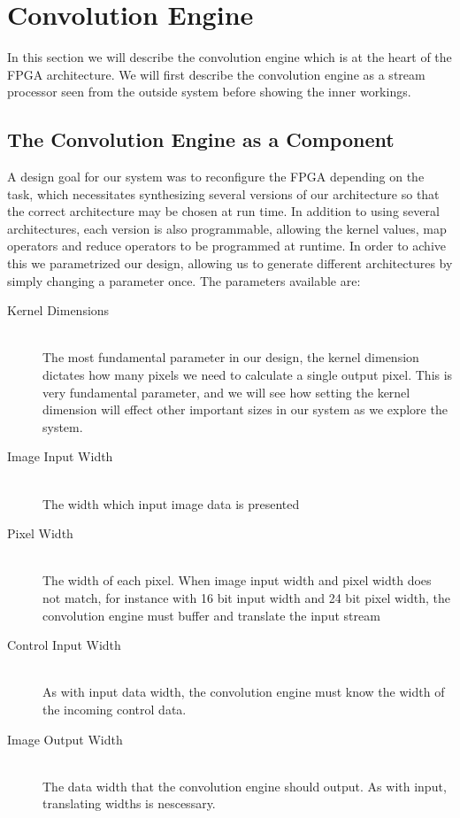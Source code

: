 \section{Convolution Engine}
\label{sec:processor}
In this section we will describe the convolution engine which is at the heart of the FPGA architecture.
We will first describe the convolution engine as a stream processor seen from the outside system before showing the inner workings.

\subsection{The Convolution Engine as a Component}
A design goal for our system was to reconfigure the FPGA depending on the task, which necessitates synthesizing several versions of our architecture so that the correct architecture may be chosen at run time.
In addition to using several architectures, each version is also programmable, allowing the kernel values, map operators and reduce operators to be programmed at runtime.
In order to achive this we parametrized our design, allowing us to generate different architectures by simply changing a parameter once.
The parameters available are:

\begin{description}
    \item[Kernel Dimensions] \hfill \\
        The most fundamental parameter in our design, the kernel dimension dictates how many pixels we need to calculate a single output pixel.
        This is very fundamental parameter, and we will see how setting the kernel dimension will effect other important sizes in our system as we explore the system.
    \item[Image Input Width] \hfill \\
        The width which input image data is presented 
    \item[Pixel Width] \hfill \\
        The width of each pixel. When image input width and pixel width does not match, for instance with 16 bit input width and 24 bit pixel width, the convolution engine must buffer and translate the input stream 
    \item[Control Input Width] \hfill \\
        As with input data width, the convolution engine must know the width of the incoming control data.
    \item[Image Output Width] \hfill \\
        The data width that the convolution engine should output. As with input, translating widths is nescessary.
\end{description}

